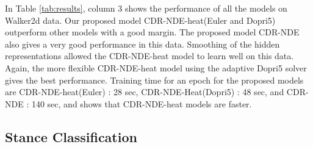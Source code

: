 \documentclass{article} %
\begin{document}
In Table \ref{tab:results}, column 3 shows the performance of all the models on Walker2d data. Our proposed model CDR-NDE-heat(Euler and Dopri5) outperform other models with a good margin. The proposed model CDR-NDE also gives a very good performance in this data. Smoothing of the hidden representations allowed the CDR-NDE-heat model to learn well on this data. Again, the more flexible CDR-NDE-heat model using the adaptive Dopri5 solver gives the best performance. Training time for an epoch for the proposed models are CDR-NDE-heat(Euler) : 28 sec, CDR-NDE-Heat(Dopri5) : 48 sec,  and CDR-NDE : 140 sec, and shows that CDR-NDE-heat models are faster. 

 \subsection{Stance Classification}

\end{document}
